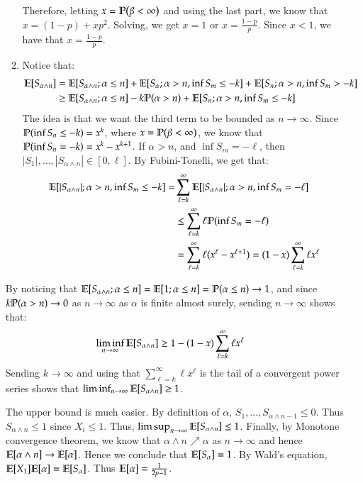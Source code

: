\documentclass[12pt]{article}
\theoremstyle{definitionstyle}
\newcommand{\1}{\mathds 1}
\renewcommand{\P}{\mathbb P \qty}
\newcommand{\E}{\mathbb E \qty}
\begin{document}
\begin{enumerate}
\begin{enumerate}[label=(\alph*)]
        Therefore, letting $x = \P(\beta < \infty)$ and using the last part, we know that $x = (1-p) + xp^2$. Solving, we get $x = 1$ or $x = \frac{1-p}{p}$. Since $x < 1$, we have that $x = \frac{1-p}{p}$. 

            \item Notice that:
            \begin{align*}
                \E[S_{\alpha \land n}] &= \E[S_{\alpha \land n} ; \alpha \leq n] + \E[S_\alpha ; \alpha > n, \inf S_m \leq -k] + \E[S_n ; \alpha > n, \inf S_m > -k] \\
                &\geq \E[S_{\alpha \land n} ; \alpha \leq n] -k\P(\alpha > n) + \E[S_n ; \alpha > n, \inf S_m \leq -k]
            \end{align*}
            The idea is that we want the third term to be bounded as $n \to \infty$. Since $\P(\inf S_n \leq -k) = x^k$, where $x = \P(\beta < \infty)$, we know that $\P(\inf S_n = -k) = x^k - x^{k+1}$. If $\alpha > n$, and $\inf S_m = -\ell$, then $|S_1|, \ldots, |S_{\alpha \land n}| \in [0, \ell]$. By Fubini-Tonelli, we get that:
            \begin{align*}
                \E[|S_{\alpha \land n}| ; \alpha > n, \inf S_m \leq -k] = &\sum_{\ell=k}^\infty \E[|S_{\alpha \land n}| ; \alpha > n, \inf S_m = -\ell] 
                \\ &\leq \sum_{\ell=k}^\infty \ell\P(\inf S_m = -\ell) 
                \\& = \sum_{\ell=k}^\infty \ell(x^\ell - x^{\ell+1}) = (1-x)\sum_{\ell=k}^\infty \ell x^\ell
            \end{align*}
            \end{enumerate}
            By noticing that $\E[S_{\alpha \land n} ; \alpha \leq n] = \E[1 ; \alpha \leq n] = \P(\alpha \leq n) \to 1$, and since $k\P(\alpha > n) \to 0$ as $n \to \infty$ as $\alpha$ is finite almost surely, sending $n \to \infty$ shows that:
            \begin{align*}
                \liminf_{n \to \infty} \E[S_{\alpha \land n}] &\geq 1 - (1-x)\sum_{\ell=k}^\infty \ell x^\ell
            \end{align*}
            Sending $k \to \infty$ and using that $\sum_{\ell=k}^\infty \ell x^\ell$ is the tail of a convergent power series shows that $\liminf_{n \to \infty} \E[S_{\alpha \land n}] \geq 1$.

            The upper bound is much easier. By definition of $\alpha$, $S_1, \ldots, S_{\alpha \land n -1} \leq 0$. Thus $S_{\alpha \land n} \leq 1$ since $X_i \leq 1$. Thus, $\limsup_{n \to \infty} \E[S_{\alpha \land n}] \leq 1$. Finally, by Monotone convergence theorem, we know that $\alpha \land n \nearrow \alpha$ as $n \to \infty$ and hence $\E[\alpha \land n] \to \E[\alpha]$. Hence we conclude that $\E[S_\alpha] = 1$. By Wald's equation, $\E[X_1] \E[\alpha] = \E[S_\alpha]$. Thus $\E[\alpha] = \frac{1}{2p-1}$.
    \end{enumerate}
\end{document}
